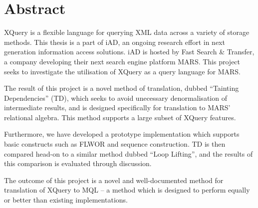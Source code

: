 \chapter*{Abstract}
XQuery is a flexible language for querying XML data across a variety of storage
methods. This thesis is a part of iAD, an ongoing research effort in
next generation information access solutions. iAD is hosted by Fast Search \&
Transfer, a company developing their next search engine platform
MARS. This project seeks to investigate the utilisation of XQuery as a query
language for MARS.

The result of this project is a novel method of translation, dubbed ``Tainting
Dependencies'' (TD), which seeks to avoid unecessary
denormalisation of intermediate results, and is designed specifically
for translation to MARS' relational algebra. This method supports a large subset of XQuery features.

Furthermore, we have developed a prototype implementation which supports basic
constructs such as FLWOR and sequence construction. TD is
then compared head-on to a similar method dubbed ``Loop Lifting'', and the
results of this comparison is evaluated through discussion.

The outcome of this project is a novel and well-documented method for
translation of XQuery to MQL -- a method which is designed to perform equally
or better than existing implementations.
% 
